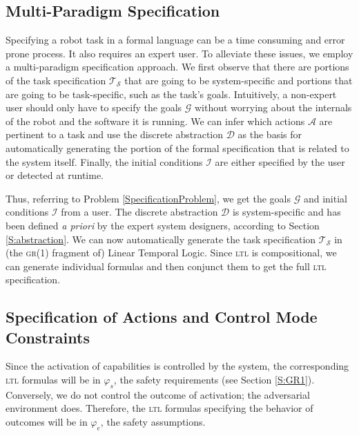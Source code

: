 
\subsection{Multi-Paradigm Specification}\label{S:multi-paradigm}

Specifying a robot task in a formal language can be a time consuming and error prone process.
It also requires an expert user.
To alleviate these issues, we employ a multi-paradigm specification approach. 
We first observe that there are portions of the task specification $\mathcal{T}_\mathcal{S}$ that are going to be system-specific and portions that are going to be task-specific, such as the task's goals.
Intuitively, a non-expert user should only have to specify the goals $\mathcal{G}$ without worrying about the internals of the robot and the software it is running.
We can infer which actions $\mathcal{A}$ are pertinent to a task and use the discrete abstraction $\mathcal{D}$ as the basis for automatically generating the portion of the formal specification that is related to the system itself.
Finally, the initial conditions $\mathcal{I}$ are either specified by the user or detected at runtime.

Thus, referring to Problem \ref{SpecificationProblem}, we get the goals $\mathcal{G}$ and initial conditions $\mathcal{I}$ from a user.
The discrete abstraction $\mathcal{D}$ is system-specific and has been defined \emph{a priori} by the expert system designers, according to Section \ref{S:abstraction}.
We can now automatically generate the task specification $\mathcal{T}_\mathcal{S}$ in (the \textsc{gr(1)} fragment \cite{Bloem2012GR1} of) Linear Temporal Logic.
Since \textsc{ltl} is compositional, we can generate individual formulas and then conjunct them to get the full \textsc{ltl} specification.


\subsection{Specification of Actions and Control Mode Constraints}

Since the activation of capabilities is controlled by the system, the corresponding \textsc{ltl} formulas will be in $\varphi_s$, the safety requirements (see Section \ref{S:GR1}).
Conversely, we do not control the outcome of activation; the adversarial environment does.
Therefore, the \textsc{ltl} formulas specifying the behavior of outcomes will be in $\varphi_e$, the safety assumptions.


